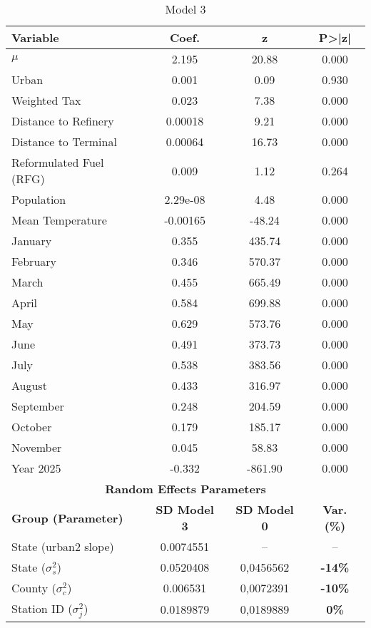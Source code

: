 
\begin{table}[H]
\centering
\caption{Model 3}
\label{tab:Model3}
\renewcommand{\arraystretch}{1.1}
\begin{tabular}{lccc}
\hline
\hline
\textbf{Variable} & \textbf{Coef.} & \textbf{z} & \textbf{P>|z|} \\
\hline
$\mu$ & 2.195 & 20.88 & 0.000 \\
Urban                & 0.001 & 0.09  & 0.930 \\
Weighted Tax                 & 0.023 & 7.38  & 0.000 \\
Distance to Refinery  & 0.00018 & 9.21 & 0.000 \\
Distance to Terminal  & 0.00064 & 16.73 & 0.000 \\
Reformulated Fuel (RFG)      & 0.009 & 1.12  & 0.264 \\
Population          & 2.29e-08 & 4.48 & 0.000 \\
Mean Temperature             & -0.00165 & -48.24 & 0.000 \\
January   & 0.355 & 435.74 & 0.000 \\
February  & 0.346 & 570.37 & 0.000 \\
March     & 0.455 & 665.49 & 0.000 \\
April     & 0.584 & 699.88 & 0.000 \\
May       & 0.629 & 573.76 & 0.000 \\
June      & 0.491 & 373.73 & 0.000 \\
July      & 0.538 & 383.56 & 0.000 \\
August    & 0.433 & 316.97 & 0.000 \\
September & 0.248 & 204.59 & 0.000 \\
October   & 0.179 & 185.17 & 0.000 \\
November  & 0.045 & 58.83  & 0.000 \\
Year 2025 & -0.332 & -861.90 & 0.000 \\
\hline
\hline
\multicolumn{4}{c}{\textbf{Random Effects Parameters}} \\
\hline
\textbf{Group (Parameter)} & \textbf{SD Model 3} & \textbf{SD Model 0} & \textbf{Var. (\%)} \\
\hline
State (urban2 slope)        & 0.0074551 & --       & --     \\
State ($\sigma_s^2$)        & 0.0520408 & 0,0456562    & \textbf{-14\%} \\
County ($\sigma_c^2$)       & 0.006531  & 0,0072391   & \textbf{-10\%} \\
Station ID ($\sigma_j^2$)   & 0.0189879 & 0,0189889   & \textbf{0\%} \\

\end{tabular}
\end{table}
